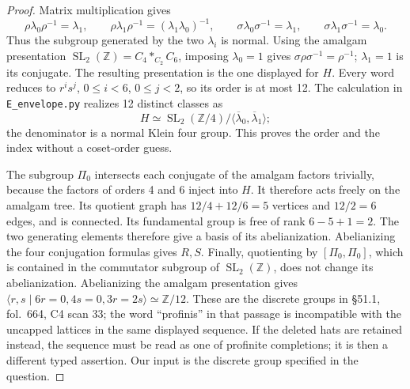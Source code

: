 \begin{proof}
Matrix multiplication gives
\[
 \rho\lambda_0\rho^{-1}=\lambda_1,\qquad
 \rho\lambda_1\rho^{-1}=(\lambda_1\lambda_0)^{-1},\qquad
 \sigma\lambda_0\sigma^{-1}=\lambda_1,\qquad
 \sigma\lambda_1\sigma^{-1}=\lambda_0.
\]
Thus the subgroup generated by the two \(\lambda_i\) is normal.
Using the amalgam presentation
\(\operatorname{SL}_2(\mathbb Z)=C_4*_{C_2}C_6\), imposing
\(\lambda_0=1\) gives \(\sigma\rho\sigma^{-1}=\rho^{-1}\);
\(\lambda_1=1\) is its conjugate.  The resulting presentation is
the one displayed for \(H\).  Every word reduces to
\(r^is^j\), \(0\leq i<6\), \(0\leq j<2\), so its order is at
most 12.  The calculation in \texttt{E\_envelope.py} realizes
12 distinct classes as
\[
 H\simeq\operatorname{SL}_2(\mathbb Z/4)/
                 \langle\overline\lambda_0,\overline\lambda_1\rangle;
\]
the denominator is a normal Klein four group.  This proves the
order and the index without a coset-order guess.

The subgroup \(\Pi_0\) intersects each conjugate of the amalgam
factors trivially, because the factors of orders 4 and 6 inject
into \(H\).  It therefore acts freely on the amalgam tree.  Its
quotient graph has \(12/4+12/6=5\) vertices and \(12/2=6\) edges,
and is connected.  Its fundamental group is free of rank
\(6-5+1=2\).  The two generating elements therefore give a basis
of its abelianization.  Abelianizing the four conjugation formulas
gives \(R,S\).  Finally, quotienting by \([\Pi_0,\Pi_0]\), which
is contained in the commutator subgroup of \(\operatorname{SL}_2(\mathbb Z)\),
does not change its abelianization.  Abelianizing the amalgam
presentation gives
\(\langle r,s\mid6r=0,4s=0,3r=2s\rangle\simeq\mathbb Z/12\).
These are the discrete groups in \S51.1, fol.~664, C4 scan 33;
the word ``profinis'' in that passage is incompatible with the
uncapped lattices in the same displayed sequence.  If the deleted
hats are retained instead, the sequence must be read as one of
profinite completions; it is then a different typed assertion.
Our input is the discrete group specified in the question.
\end{proof}


